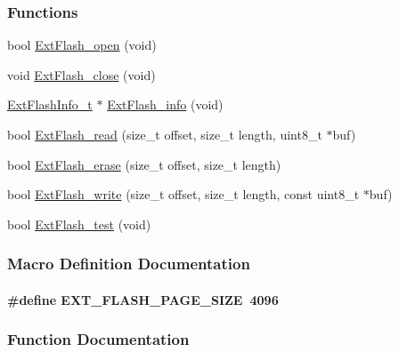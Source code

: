 \subsubsection*{Functions}
\begin{DoxyCompactItemize}
\item 
bool \hyperlink{_ext_flash_8h_ad4b1bd8b121baef366934a9815871124}{Ext\+Flash\+\_\+open} (void)
\item 
void \hyperlink{_ext_flash_8h_ad456be39a9a700212437ff438410a594}{Ext\+Flash\+\_\+close} (void)
\item 
\hyperlink{struct_ext_flash_info__t}{Ext\+Flash\+Info\+\_\+t} $\ast$ \hyperlink{_ext_flash_8h_a30939a5a39e9fbfcd23022c23083b66e}{Ext\+Flash\+\_\+info} (void)
\item 
bool \hyperlink{_ext_flash_8h_a2d9f04462020d01ac5fdb55418b077b9}{Ext\+Flash\+\_\+read} (size\+\_\+t offset, size\+\_\+t length, uint8\+\_\+t $\ast$buf)
\item 
bool \hyperlink{_ext_flash_8h_a3f0495f78fc59522bbd47b3965bfd325}{Ext\+Flash\+\_\+erase} (size\+\_\+t offset, size\+\_\+t length)
\item 
bool \hyperlink{_ext_flash_8h_af4e3c0fef71d31bb67c44979abab1feb}{Ext\+Flash\+\_\+write} (size\+\_\+t offset, size\+\_\+t length, const uint8\+\_\+t $\ast$buf)
\item 
bool \hyperlink{_ext_flash_8h_a4f1fb7e68cb15dac521126d472edd81b}{Ext\+Flash\+\_\+test} (void)
\end{DoxyCompactItemize}


\subsubsection{Macro Definition Documentation}
\paragraph[{E\+X\+T\+\_\+\+F\+L\+A\+S\+H\+\_\+\+P\+A\+G\+E\+\_\+\+S\+I\+Z\+E}]{\setlength{\rightskip}{0pt plus 5cm}\#define E\+X\+T\+\_\+\+F\+L\+A\+S\+H\+\_\+\+P\+A\+G\+E\+\_\+\+S\+I\+Z\+E~4096}\label{_ext_flash_8h_a0bc5316ab502ed58a098eef500545d88}


\subsubsection{Function Documentation}

